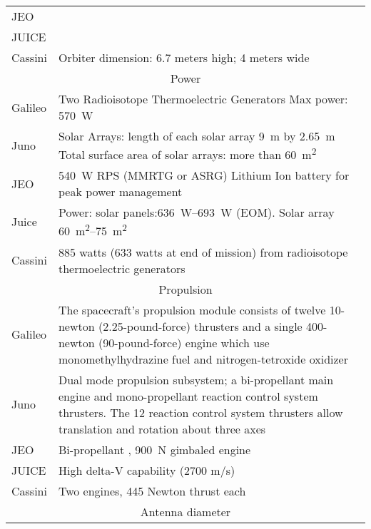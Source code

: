 \begin{longtable}{lp{}}
  JEO & \\

  JUICE & \\

  Cassini & Orbiter dimension: 6.7 meters high; 4 meters wide \\

  \multicolumn{2}{c}{Power} \\ \midrule

  Galileo & Two Radioisotope Thermoelectric Generators Max power:
  \SI{570}{W} \\

  Juno & Solar Arrays: length of each solar array \SI{9}{m} by
  \SI{2.65}{m} Total surface area of solar arrays: more than
  \SI{60}{m^2} \\

  JEO & \SI{540}{W} RPS (MMRTG or ASRG) Lithium Ion battery for peak
  power management \\

  Juice & Power: solar panels:\SIrange{636}{693}{W} (EOM). Solar array
  \SIrange{60}{75}{m^2} \\

  Cassini & 885 watts (633 watts at end of mission) from radioisotope
  thermoelectric generators \\

  \multicolumn{2}{c}{Propulsion} \\ \midrule

  Galileo & The spacecraft's propulsion module consists of twelve
  10-newton (2.25-pound-force) thrusters and a single 400-newton
  (90-pound-force) engine which use monomethylhydrazine fuel and
  nitrogen-tetroxide oxidizer \\

  Juno & Dual mode propulsion subsystem; a bi-propellant main engine and
  mono-propellant reaction control system thrusters. The 12 reaction
  control system thrusters allow translation and rotation about three
  axes \\

  JEO & Bi-propellant , \SI{900}{N} gimbaled engine \\

  JUICE & High delta-V capability (2700 m/s) \\

  Cassini & Two engines, 445 Newton thrust each \\

  \multicolumn{2}{c}{Antenna diameter} \\ \midrule


\end{longtable}

